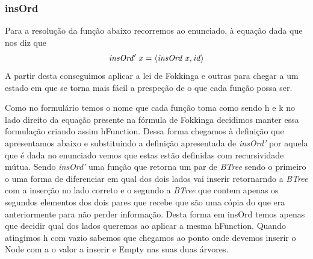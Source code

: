 \documentclass[a4paper]{article}
\newcommand{\Varid}[1]{\mathit{#1}}
\begin{document}
\subsubsection*{insOrd}
Para a resolução da função abaixo recorremos ao enunciado, à equação dada que nos diz que \begin{eqnarray*} \ensuremath{\Varid{insOrd'}\;\Varid{x}\mathrel{=}\conj{\Varid{insOrd}\;\Varid{x}}{\Varid{id}}} \end{eqnarray*} A partir desta conseguimos aplicar a lei de Fokkinga e outras para chegar a um estado em que se torna mais fácil a prespeção de o que cada função possa ser.

Como no formulário temos o nome que cada função toma como sendo h e k no lado direito da equação presente na fórmula de Fokkinga decidimos manter essa formulação criando assim hFunction.
Dessa forma chegamos à definição que apresentamos abaixo e substituindo a definição apresentada de \textit{insOrd'} por aquela que é dada no enunciado vemos que estas estão definidas com recursividade mútua.
Sendo \textit{insOrd'} uma função que retorna um par de \textit{BTree} sendo o primeiro o uma forma de diferenciar em qual dos dois lados vai inserir retornarndo a \textit{BTree} com a inserção no lado correto e o segundo a \textit{BTree} que contem apenas os segundos elementos dos dois pares que recebe que são uma cópia do que era anteriormente para não perder informação.
Desta forma em insOrd temos apenas que decidir qual dos lados queremos ao aplicar a mesma hFunction.
Quando atingimos h com vazio sabemos que chegamos ao ponto onde devemos inserir o Node com a o valor a inserir e Empty nas suas duas árvores.
\end{document}

